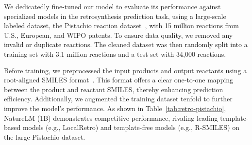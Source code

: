 We dedicatedly fine-tuned our \ourM{} model to evaluate its performance against specialized models in the retrosynthesis prediction task, using a large-scale labeled dataset, the Pistachio reaction dataset~\cite{mayfield2017pistachio}, with 15 million reactions from U.S., European, and WIPO patents. 
To ensure data quality, we removed any invalid or duplicate reactions.
The cleaned dataset was then randomly split into a training set with 3.1 million reactions and a test set with 34,000 reactions.

Before training, we preprocessed the input products and output reactants using a root-aligned SMILES format~\cite{Zhong2022rsmiles}.
This format offers a clear one-to-one mapping between the product and reactant SMILES, 
thereby enhancing prediction efficiency.
Additionally, we augmented the training dataset tenfold to further improve the model's performance.
As shown in Table~\ref{tab:retro-pistachio}, NatureLM (1B) demonstrates competitive performance, rivaling leading template-based models (e.g., LocalRetro) and template-free models (e.g., R-SMILES) on the large Pistachio dataset.

